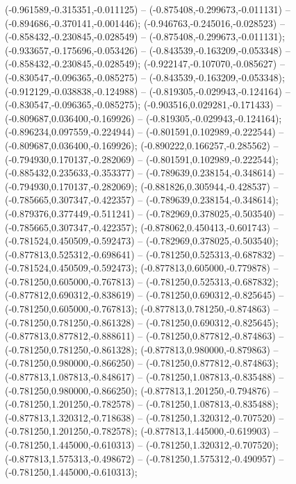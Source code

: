  (-0.961589,-0.315351,-0.011125) -- (-0.875408,-0.299673,-0.011131) -- (-0.894686,-0.370141,-0.001446);
 (-0.946763,-0.245016,-0.028523) -- (-0.858432,-0.230845,-0.028549) -- (-0.875408,-0.299673,-0.011131);
 (-0.933657,-0.175696,-0.053426) -- (-0.843539,-0.163209,-0.053348) -- (-0.858432,-0.230845,-0.028549);
 (-0.922147,-0.107070,-0.085627) -- (-0.830547,-0.096365,-0.085275) -- (-0.843539,-0.163209,-0.053348);
 (-0.912129,-0.038838,-0.124988) -- (-0.819305,-0.029943,-0.124164) -- (-0.830547,-0.096365,-0.085275);
 (-0.903516,0.029281,-0.171433) -- (-0.809687,0.036400,-0.169926) -- (-0.819305,-0.029943,-0.124164);
 (-0.896234,0.097559,-0.224944) -- (-0.801591,0.102989,-0.222544) -- (-0.809687,0.036400,-0.169926);
 (-0.890222,0.166257,-0.285562) -- (-0.794930,0.170137,-0.282069) -- (-0.801591,0.102989,-0.222544);
 (-0.885432,0.235633,-0.353377) -- (-0.789639,0.238154,-0.348614) -- (-0.794930,0.170137,-0.282069);
 (-0.881826,0.305944,-0.428537) -- (-0.785665,0.307347,-0.422357) -- (-0.789639,0.238154,-0.348614);
 (-0.879376,0.377449,-0.511241) -- (-0.782969,0.378025,-0.503540) -- (-0.785665,0.307347,-0.422357);
 (-0.878062,0.450413,-0.601743) -- (-0.781524,0.450509,-0.592473) -- (-0.782969,0.378025,-0.503540);
 (-0.877813,0.525312,-0.698641) -- (-0.781250,0.525313,-0.687832) -- (-0.781524,0.450509,-0.592473);
 (-0.877813,0.605000,-0.779878) -- (-0.781250,0.605000,-0.767813) -- (-0.781250,0.525313,-0.687832);
 (-0.877812,0.690312,-0.838619) -- (-0.781250,0.690312,-0.825645) -- (-0.781250,0.605000,-0.767813);
 (-0.877813,0.781250,-0.874863) -- (-0.781250,0.781250,-0.861328) -- (-0.781250,0.690312,-0.825645);
 (-0.877813,0.877812,-0.888611) -- (-0.781250,0.877812,-0.874863) -- (-0.781250,0.781250,-0.861328);
 (-0.877813,0.980000,-0.879863) -- (-0.781250,0.980000,-0.866250) -- (-0.781250,0.877812,-0.874863);
 (-0.877813,1.087813,-0.848617) -- (-0.781250,1.087813,-0.835488) -- (-0.781250,0.980000,-0.866250);
 (-0.877813,1.201250,-0.794876) -- (-0.781250,1.201250,-0.782578) -- (-0.781250,1.087813,-0.835488);
 (-0.877813,1.320312,-0.718638) -- (-0.781250,1.320312,-0.707520) -- (-0.781250,1.201250,-0.782578);
 (-0.877813,1.445000,-0.619903) -- (-0.781250,1.445000,-0.610313) -- (-0.781250,1.320312,-0.707520);
 (-0.877813,1.575313,-0.498672) -- (-0.781250,1.575312,-0.490957) -- (-0.781250,1.445000,-0.610313);
